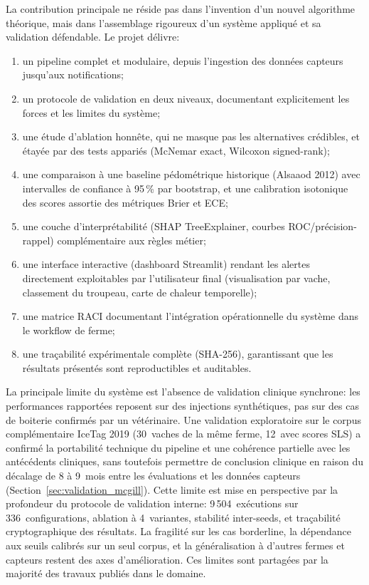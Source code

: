 \begin{conclusion}
La contribution principale ne réside pas dans l'invention d'un nouvel algorithme théorique,
mais dans l'assemblage rigoureux d'un système appliqué et sa validation défendable. Le projet
délivre:
\begin{enumerate}
    \item un pipeline complet et modulaire, depuis l'ingestion des données capteurs
    jusqu'aux notifications;
    \item un protocole de validation en deux niveaux, documentant explicitement les forces et
    les limites du système;
    \item une étude d'ablation honnête, qui ne masque pas les alternatives crédibles, et
    étayée par des tests appariés (McNemar exact, Wilcoxon signed-rank);
    \item une comparaison à une baseline pédométrique historique (Alsaaod 2012) avec
    intervalles de confiance à 95\,\% par bootstrap, et une calibration isotonique des scores
    assortie des métriques Brier et ECE;
    \item une couche d'interprétabilité (SHAP TreeExplainer, courbes ROC/précision-rappel)
    complémentaire aux règles métier;
    \item une interface interactive (dashboard Streamlit) rendant les alertes directement
    exploitables par l'utilisateur final (visualisation par vache, classement du troupeau,
    carte de chaleur temporelle);
    \item une matrice RACI documentant l'intégration opérationnelle du système dans le
    workflow de ferme;
    \item une traçabilité expérimentale complète (SHA-256), garantissant que les résultats
    présentés sont reproductibles et auditables.
\end{enumerate}

La principale limite du système est l'absence de validation clinique synchrone:
les performances rapportées reposent sur des injections synthétiques, pas sur des cas
de boiterie confirmés par un vétérinaire. Une validation exploratoire sur le corpus
complémentaire IceTag 2019 (30~vaches de la même ferme, 12~avec scores SLS) a confirmé
la portabilité technique du pipeline et une cohérence partielle avec les antécédents
cliniques, sans toutefois permettre de conclusion clinique en raison du décalage de
8 à 9~mois entre les évaluations et les données capteurs
(Section~\ref{sec:validation_mcgill}). Cette limite
est mise en perspective par la profondeur du protocole de validation interne: 9\,504~exécutions sur
336~configurations, ablation à 4~variantes, stabilité inter-seeds, et traçabilité
cryptographique des résultats. La fragilité sur les cas borderline, la dépendance aux
seuils calibrés sur un seul corpus, et la généralisation à d'autres fermes et capteurs
restent des axes d'amélioration. Ces limites sont partagées par la majorité des travaux
publiés dans le domaine.


\end{conclusion}
